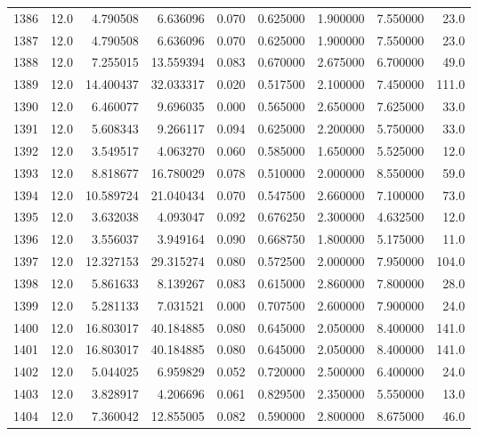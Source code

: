 \begin{tabular}{lrrrrrrrr}
1386 &   12.0 &   4.790508 &   6.636096 &  0.070 &  0.625000 &  1.900000 &   7.550000 &   23.0 \\
1387 &   12.0 &   4.790508 &   6.636096 &  0.070 &  0.625000 &  1.900000 &   7.550000 &   23.0 \\
1388 &   12.0 &   7.255015 &  13.559394 &  0.083 &  0.670000 &  2.675000 &   6.700000 &   49.0 \\
1389 &   12.0 &  14.400437 &  32.033317 &  0.020 &  0.517500 &  2.100000 &   7.450000 &  111.0 \\
1390 &   12.0 &   6.460077 &   9.696035 &  0.000 &  0.565000 &  2.650000 &   7.625000 &   33.0 \\
1391 &   12.0 &   5.608343 &   9.266117 &  0.094 &  0.625000 &  2.200000 &   5.750000 &   33.0 \\
1392 &   12.0 &   3.549517 &   4.063270 &  0.060 &  0.585000 &  1.650000 &   5.525000 &   12.0 \\
1393 &   12.0 &   8.818677 &  16.780029 &  0.078 &  0.510000 &  2.000000 &   8.550000 &   59.0 \\
1394 &   12.0 &  10.589724 &  21.040434 &  0.070 &  0.547500 &  2.660000 &   7.100000 &   73.0 \\
1395 &   12.0 &   3.632038 &   4.093047 &  0.092 &  0.676250 &  2.300000 &   4.632500 &   12.0 \\
1396 &   12.0 &   3.556037 &   3.949164 &  0.090 &  0.668750 &  1.800000 &   5.175000 &   11.0 \\
1397 &   12.0 &  12.327153 &  29.315274 &  0.080 &  0.572500 &  2.000000 &   7.950000 &  104.0 \\
1398 &   12.0 &   5.861633 &   8.139267 &  0.083 &  0.615000 &  2.860000 &   7.800000 &   28.0 \\
1399 &   12.0 &   5.281133 &   7.031521 &  0.000 &  0.707500 &  2.600000 &   7.900000 &   24.0 \\
1400 &   12.0 &  16.803017 &  40.184885 &  0.080 &  0.645000 &  2.050000 &   8.400000 &  141.0 \\
1401 &   12.0 &  16.803017 &  40.184885 &  0.080 &  0.645000 &  2.050000 &   8.400000 &  141.0 \\
1402 &   12.0 &   5.044025 &   6.959829 &  0.052 &  0.720000 &  2.500000 &   6.400000 &   24.0 \\
1403 &   12.0 &   3.828917 &   4.206696 &  0.061 &  0.829500 &  2.350000 &   5.550000 &   13.0 \\
1404 &   12.0 &   7.360042 &  12.855005 &  0.082 &  0.590000 &  2.800000 &   8.675000 &   46.0 \\

\end{tabular}
